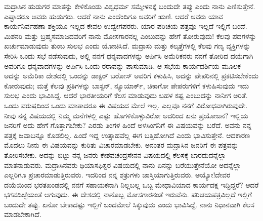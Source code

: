 ಮದ್ರಾಸಿನ ಹುಡುಗರ ಮಾತನ್ನು ಕೇಳಿಕೊಂಡು ವಿಶ್ವಧರ್ಮ ಸಮ್ಮೇಳನಕ್ಕೆ ಬಂದುದೇ ತಪ್ಪು ಎಂದು ನಾನು ಎಣಿಸುತ್ತೇನೆ. ಎಷ್ಟಾದರೂ ಅವರು ಹುಡುಗರು. ಆದರೆ ನಾನು ಎಂದೆಂದಿಗೂ ಅವರಿಗೆ ಋಣಿ. ಆದರೆ ಅವರು ಯಾವ ಕಾರ್ಯನಿರ್ವಹಣಾ ಶಕ್ತಿಯೂ ಇಲ್ಲದ ಕೇವಲ ಉದ್ವೇಗಪರರು. ಯಾರ ಪರಿಚಯ ಪತ್ರವೂ ಇಲ್ಲದೆ ಇಲ್ಲಿಗೆ ಬಂದೆ. ಮಿಶನರಿ ಮತ್ತು ಬ್ರಹ್ಮಸಮಾಜದವರಿಗೆ ನಾನು ಮೋಸಗಾರನಲ್ಲ ಎಂಬುದನ್ನು ಹೇಗೆ ತೋರುವುದು! ಕೆಲವು ಪದಗಳನ್ನು ಖರ್ಚುಮಾಡುವುದು ತುಂಬ ಸುಲಭ ಎಂದು ಯೋಚಿಸಿದೆ. ಮದ್ರಾಸು ಮತ್ತು ಕಲ್ಕತ್ತೆಗಳಲ್ಲಿ ಕೆಲವು ಗಣ್ಯ ವ್ಯಕ್ತಿಗಳನ್ನು ಸೇರಿಸಿ ಒಂದು ಸಭೆ ನಡೆಸುವುದು, ಅಲ್ಲಿ ನನಗೆ ಧನ್ಯವಾದಗಳನ್ನು ಅರ್ಪಿಸಿ ಅಮೆರಿಕನರು ನನಗೆ ತೋರಿದ ದಯೆಗಾಗಿ ಅವರಿಗೂ ಧನ್ಯವಾದಗಳನ್ನು ಅರ್ಪಿಸಿ ಒಂದು ಠರಾವನ್ನು ಪಾಸುಮಾಡಿ, ಆ ಸಭೆಯ ಕಾರ್ಯದರ್ಶಿಯ ಮೂಲಕ ಅದನ್ನು ಅಮೆರಿಕಾ ದೇಶದಲ್ಲಿ ಒಂದನ್ನು ಡಾಕ್ಟರ್ ಬರೋಸ್ ಅವರಿಗೆ ಕಳುಹಿಸಿ, ಅದನ್ನು ಪೇಪರಿನಲ್ಲಿ ಪ್ರಕಟಿಸಬೇಕೆಂದು ಕೋರುವುದು; ಮತ್ತೆ ಕೆಲವು ಪ್ರತಿಗಳನ್ನು ಬಾಸ್ಟನ್, ನ್ಯೂಯಾರ್ಕ್, ಚಿಕಾಗೋ ಪೇಪರುಗಳಿಗೆ ಕಳುಹಿಸುವುದು \enginline{-} ಇದು ಸುಲಭ ಎಂದು ಭಾವಿಸಿದ್ದೆ. ಆದರೆ ಭಾರತೀಯರಿಗೆ ಕೆಲಸ ಮಾಡುವುದು ಬಹಳ ಕಷ್ಟ ಎಂಬುದನ್ನು ನಾನೀಗ ಅರಿತೆ. ಒಂದು ವರುಷದಿಂದ ಒಂದು ಮಾತಾದರೂ ಈ ವಿಷಯದ ಮೇಲೆ ಇಲ್ಲ. ಎಲ್ಲವೂ ನನಗೆ ವಿರೋಧವಾಗಿರುವುದೇ. ನೀವು ನನ್ನ ವಿಷಯದಲ್ಲಿ ನಿಮ್ಮ ಮನೆಗಳಲ್ಲಿ ಎಷ್ಟು ಹೊಗಳಿಕೊಳ್ಳುವಿರೋ ಅದರಿಂದ ಏನು ಪ್ರಯೋಜನ? ಇಲ್ಲಿಯ ಜನರಿಗೆ ಅದು ಹೇಗೆ ಗೊತ್ತಾಗಬೇಕು? ಎರಡು ತಿಂಗಳ ಹಿಂದೆ ಅಳಸಿಂಗನಿಗೆ ಈ ವಿಷಯವನ್ನು ಬರೆದೆ. ಅವನು ನನ್ನ ಪತ್ರಕ್ಕೆ ಜವಾಬನ್ನೂ ಕೊಡಲಿಲ್ಲ. ಹಿಂದೆ ಇದ್ದ ಉತ್ಸಾಹವೆಲ್ಲ ಈಗ ಬತ್ತಿಹೋಗಿದೆ ಎಂದು ಭಾವಿಸುತ್ತೇನೆ. ಆದಕಾರಣ ಮೊದಲು ನೀನು ಈ ವಿಷಯವನ್ನು ಕುರಿತು ವಿಚಾರಮಾಡಬೇಕು. ಅನಂತರ ಮದ್ರಾಸಿನ ಜನರಿಗೆ ಈ ಪತ್ರವನ್ನು ತೋರಿಸಬೇಕು. ಅದನ್ನು ಬಿಟ್ಟು ನನ್ನ ಜನರು ಕೇಶವಚಂದ್ರಸೇನನ ವಿಷಯದಲ್ಲಿ ಕೆಲಸಕ್ಕೆ ಬಾರದುದನ್ನೆಲ್ಲಾ ಮಾತನಾಡುವರು. ಮದ್ರಾಸಿನವರು ಥಿಯಾಸಫಿಸ್ಟರ ವಿಷಯದಲ್ಲಿ ನಾನು ಏನನ್ನು ಬರೆಯುತ್ತೇನೆಯೋ ಅದನ್ನೆಲ್ಲಾ ಎಲ್ಲರಿಗೂ ಪ್ರಚಾರಮಾಡುತ್ತಿರುವರು. ಇದರಿಂದ ನನ್ನ ಶತ್ರುಗಳು ಜಾಸ್ತಿಯಾಗುತ್ತಿರುವರು. ಅಯ್ಯೋ!ದೇವರ ದಯೆಯಿಂದ ಭರತಖಂಡದಲ್ಲಿ ನನಗೆ ಸಹಾಯಕನಾಗಿ ನಿಲ್ಲಬಲ್ಲ ಒಬ್ಬ ಮೇಧಾವಿಯಾದ ಕಾರ್ಯದಕ್ಷ ಇದ್ದಿದ್ದರೆ? ಆದರೆ ಭಗವದಿಚ್ಛೆಯಂತೆ ಆಗುವುದು. ಈ ದೇಶದಲ್ಲಿ ನಾನೊಬ್ಬ ಮೋಸಗಾರನಂತೆ ಇರುವೆನು. ಪರಿಚಯಪತ್ರವಿಲ್ಲದೆ ಇಲ್ಲಿಗೆ ಬಂದುದೇ ತಪ್ಪು. ಏನೋ ಬೇಕಾದಷ್ಟು ಇಲ್ಲಿಗೆ ಬಂದಮೇಲೆ ಸಿಕ್ಕುವುದು ಎಂದು ಭಾವಿಸಿದ್ದೆ. ನಾನು ನಿಧಾನವಾಗಿ ಕೆಲಸ ಮಾಡಬೇಕಾಗಿದೆ.

